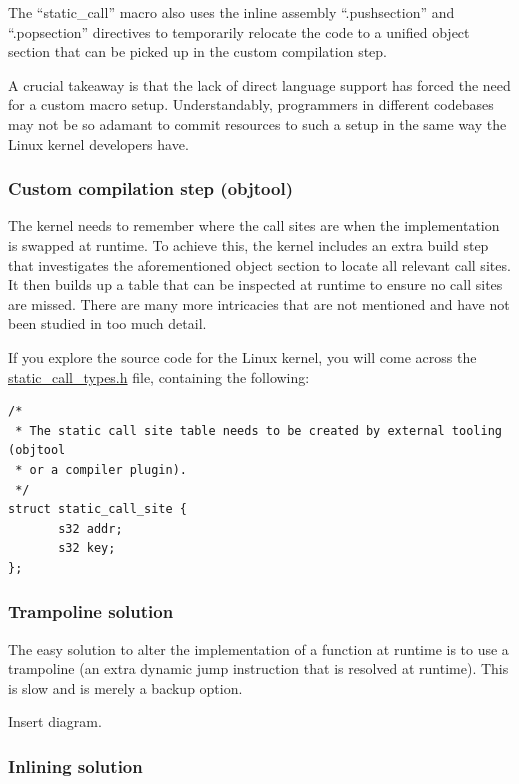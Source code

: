 \documentclass[12pt,a4paper,twoside]{report}
\begin{document}
The ``static\_call'' macro also uses the inline assembly ``.pushsection'' and ``.popsection'' directives to temporarily relocate the code to a unified object section that can be picked up in the custom compilation step.

A crucial takeaway is that the lack of direct language support has forced the need for a custom macro setup. Understandably, programmers in different codebases may not be so adamant to commit resources to such a setup in the same way the Linux kernel developers have.

\subsubsection{Custom compilation step (objtool)}

The kernel needs to remember where the call sites are when the implementation is swapped at runtime. To achieve this, the kernel includes an extra build step that investigates the aforementioned object section to locate all relevant call sites. It then builds up a table that can be inspected at runtime to ensure no call sites are missed. There are many more intricacies that are not mentioned and have not been studied in too much detail.

If you explore the source code for the Linux kernel, you will come across the \href{https://github.com/torvalds/linux/blob/master/include/linux/static_call_types.h}{static\_call\_types.h} file, containing the following:

\begin{verbatim}
/*
 * The static call site table needs to be created by external tooling (objtool
 * or a compiler plugin).
 */
struct static_call_site {
	   s32 addr;
	   s32 key;
};
\end{verbatim}

\subsubsection{Trampoline solution}

The easy solution to alter the implementation of a function at runtime is to use a trampoline (an extra dynamic jump instruction that is resolved at runtime). This is slow and is merely a backup option.

Insert diagram.

\subsubsection{Inlining solution}
\end{document}

